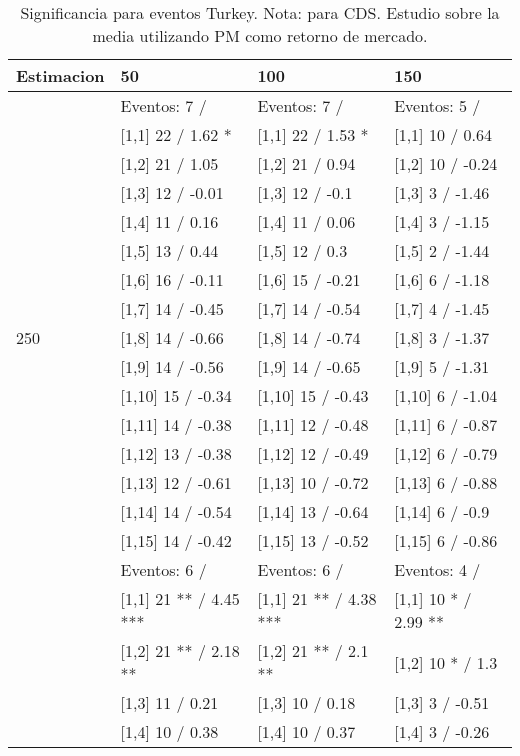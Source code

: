 \begin{table}

\caption{Significancia para eventos Turkey. Nota: para CDS. Estudio sobre la media utilizando PM como retorno de mercado.}
\centering
\begin{tabular}[t]{llll}
\toprule
Estimacion & 50 & 100 & 150\\
\midrule
 & Eventos:  7 / & Eventos:  7 / & Eventos:  5 /\\
 & {}[1,1] 22  / 1.62 * & {}[1,1] 22  / 1.53 * & {}[1,1] 10  / 0.64\\
 & {}[1,2] 21  / 1.05 & {}[1,2] 21  / 0.94 & {}[1,2] 10  / -0.24\\
 & {}[1,3] 12  / -0.01 & {}[1,3] 12  / -0.1 & {}[1,3] 3  / -1.46\\
 & {}[1,4] 11  / 0.16 & {}[1,4] 11  / 0.06 & {}[1,4] 3  / -1.15\\
\addlinespace
 & {}[1,5] 13  / 0.44 & {}[1,5] 12  / 0.3 & {}[1,5] 2  / -1.44\\
 & {}[1,6] 16  / -0.11 & {}[1,6] 15  / -0.21 & {}[1,6] 6  / -1.18\\
 & {}[1,7] 14  / -0.45 & {}[1,7] 14  / -0.54 & {}[1,7] 4  / -1.45\\
250 & {}[1,8] 14  / -0.66 & {}[1,8] 14  / -0.74 & {}[1,8] 3  / -1.37\\
 & {}[1,9] 14  / -0.56 & {}[1,9] 14  / -0.65 & {}[1,9] 5  / -1.31\\
\addlinespace
 & {}[1,10] 15  / -0.34 & {}[1,10] 15  / -0.43 & {}[1,10] 6  / -1.04\\
 & {}[1,11] 14  / -0.38 & {}[1,11] 12  / -0.48 & {}[1,11] 6  / -0.87\\
 & {}[1,12] 13  / -0.38 & {}[1,12] 12  / -0.49 & {}[1,12] 6  / -0.79\\
 & {}[1,13] 12  / -0.61 & {}[1,13] 10  / -0.72 & {}[1,13] 6  / -0.88\\
 & {}[1,14] 14  / -0.54 & {}[1,14] 13  / -0.64 & {}[1,14] 6  / -0.9\\
\addlinespace
 & {}[1,15] 14  / -0.42 & {}[1,15] 13  / -0.52 & {}[1,15] 6  / -0.86\\
 & Eventos:  6 / & Eventos:  6 / & Eventos:  4 /\\
 & {}[1,1] 21 ** / 4.45 *** & {}[1,1] 21 ** / 4.38 *** & {}[1,1] 10 * / 2.99 **\\
 & {}[1,2] 21 ** / 2.18 ** & {}[1,2] 21 ** / 2.1 ** & {}[1,2] 10 * / 1.3\\
 & {}[1,3] 11  / 0.21 & {}[1,3] 10  / 0.18 & {}[1,3] 3  / -0.51\\
\addlinespace
 & {}[1,4] 10  / 0.38 & {}[1,4] 10  / 0.37 & {}[1,4] 3  / -0.26\\

\end{tabular}
\end{table}
